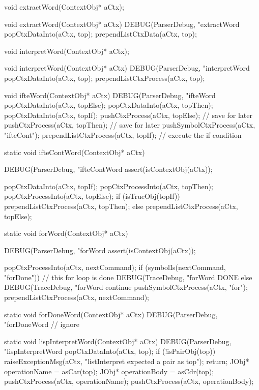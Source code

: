 \startCHeader
void extractWord(ContextObj* aCtx);
\stopCHeader

\startCCode
void extractWord(ContextObj* aCtx) {
  DEBUG(ParserDebug, "extractWord%
  popCtxDataInto(aCtx, top);
  prependListCtxData(aCtx, top);
}
\stopCCode

\startCHeader
void interpretWord(ContextObj* aCtx);
\stopCHeader

\startCCode
void interpretWord(ContextObj* aCtx) {
  DEBUG(ParserDebug, "interpretWord%
  popCtxDataInto(aCtx, top);
  prependListCtxProcess(aCtx, top);
}
\stopCCode

\startCCode
void ifteWord(ContextObj* aCtx) {
  DEBUG(ParserDebug, "ifteWord%
  popCtxDataInto(aCtx, topElse);
  popCtxDataInto(aCtx, topThen);
  popCtxDataInto(aCtx, topIf);
  pushCtxProcess(aCtx, topElse); // save for later
  pushCtxProcess(aCtx, topThen); // save for later
  pushSymbolCtxProcess(aCtx, "ifteCont");
  prependListCtxProcess(aCtx, topIf); // execute the if condition
}
\stopCCode

\startCCode
static void ifteContWord(ContextObj* aCtx) {
  DEBUG(ParserDebug, "ifteContWord%
  assert(isContextObj(aCtx));

  popCtxDataInto(aCtx, topIf);
  popCtxProcessInto(aCtx, topThen);
  popCtxProcessInto(aCtx, topElse);
  if (isTrueObj(topIf)) {
    prependListCtxProcess(aCtx, topThen);
  } else {
    prependListCtxProcess(aCtx, topElse);
  }
}
\stopCCode

\startCCode
static void forWord(ContextObj* aCtx) {
  DEBUG(ParserDebug, "forWord%
  assert(isContextObj(aCtx));

  popCtxProcessInto(aCtx, nextCommand);
  if (symbolIs(nextCommand, "forDone")) {
    // this for loop is done
    DEBUG(TraceDebug, "forWord DONE%
  } else {
    DEBUG(TraceDebug, "forWord continue%
    pushSymbolCtxProcess(aCtx, "for");
    prependListCtxProcess(aCtx, nextCommand);
  }
}
\stopCCode

\startCCode
static void forDoneWord(ContextObj* aCtx) {
  DEBUG(ParserDebug, "forDoneWord%
  // ignore
}
\stopCCode

\startCCode
static void lispInterpretWord(ContextObj* aCtx) {
  DEBUG(ParserDebug, "lispInterpretWord%
  popCtxDataInto(aCtx, top);
  if (!isPairObj(top)) {
    raiseExceptionMsg(aCtx,
      "listInterpret expected a pair as top");
    return;
  }
  JObj* operationName = asCar(top);
  JObj* operationBody = asCdr(top);
  pushCtxProcess(aCtx, operationName);
  pushCtxProcess(aCtx, operationBody);
}
\stopCCode

